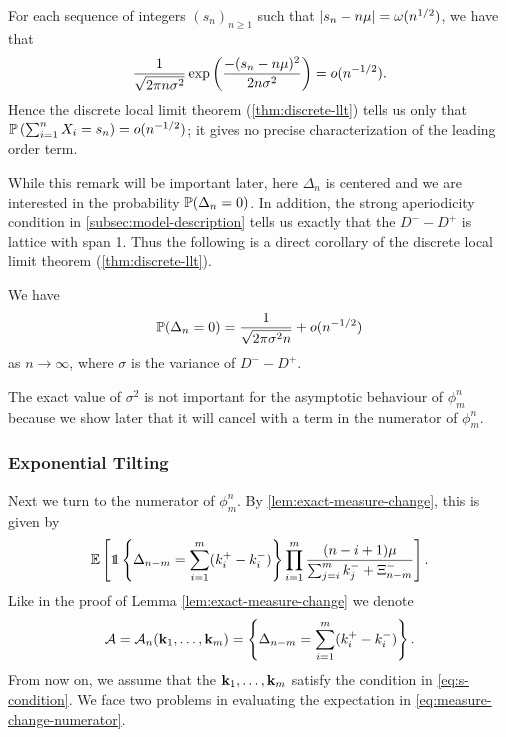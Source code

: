 \begin{remark}
    \label{rem:llt-limitations}
    For each sequence of integers $(s_n)_{n \geq 1}$ such that $\abs{s_n - n \mu} = \littleomega(n^{1/2})$, we have that
    \begin{equation*}
        \frac{1}{\sqrt{2 \pi n \sigma^2}}  \exp \left(
            \frac{-(s_n - n \mu)^2}{2 n \sigma^2}
        \right)
        = \littleo(n^{-1/2}).
    \end{equation*}
    Hence the discrete local limit theorem (\cref{thm:discrete-llt}) tells us only that $\P\left(\sum_{i=1}^n X_i = s_n\right) = \littleo(n^{-1/2})$; it gives no precise characterization of the leading order term.
\end{remark}

While this remark will be important later, here $\Delta_n$ is centered and we are interested in the probability $\P(\Delta_n = 0)$. In addition, the strong aperiodicity condition in \cref{subsec:model-description} tells us exactly that the $D^- - D^+$ is lattice with span 1. Thus the following is a direct corollary of the discrete local limit theorem (\cref{thm:discrete-llt}).
\begin{corollary}
    \label{cor:measure-change-denominator-control}
    We have
    \begin{equation*}
        \P(\Delta_n = 0) = \frac{1}{\sqrt{2 \pi \sigma^2 n}} + \littleo(n^{-1/2})
    \end{equation*}
    as $n \to \infty$, where $\sigma$ is the variance of $D^- - D^+$.
\end{corollary}
\begin{remark}
    The exact value of $\sigma^2$ is not important for the asymptotic behaviour of $\phi^n_m$ because we show later that it will cancel with a term in the numerator of $\phi^n_m$.
\end{remark}

\subsubsection{Exponential Tilting}

Next we turn to the numerator of $\phi^n_m$. By \cref{lem:exact-measure-change}, this is given by
\begin{equation}
    \label{eq:measure-change-numerator}
    \E\left[ 
        \one \left\{ \Delta_{n-m} = \sum_{i=1}^m (k_i^+ - k_i^-) \right\}
        \prod_{i=1}^m \frac{(n - i + 1) \mu}{\sum_{j=i}^m k_j^- + \Xi_{n-m}^-}
    \right].
\end{equation}
Like in the proof of Lemma \ref{lem:exact-measure-change} we denote 
\begin{equation*}
    \lltEvent =\lltEvent_n (\vk_1, \ldots, \vk_m)= \left\{ \Delta_{n-m} = \sum_{i=1}^m (k_i^+ - k_i^-) \right\}.
\end{equation*}
From now on, we assume that the $\vk_1, \ldots, \vk_m$ satisfy the condition in \cref{eq:s-condition}. We face two problems in evaluating the expectation in \cref{eq:measure-change-numerator}.


